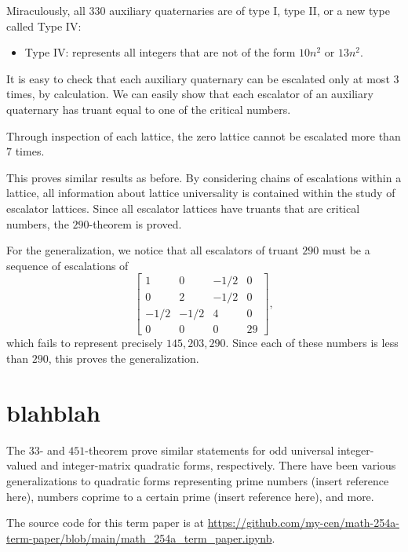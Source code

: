 \documentclass{article}
\begin{document}
Miraculously, all $330$ auxiliary quaternaries are of type I, type II, or a new type called Type IV:
\begin{itemize}
    \item Type IV: represents all integers that are not of the form $10n^2$ or $13n^2$.
\end{itemize}
It is easy to check that each auxiliary quaternary can be escalated only at most $3$ times, by calculation. We can easily show that each escalator of an auxiliary quaternary has truant equal to one of the critical numbers.

Through inspection of each lattice, the zero lattice cannot be escalated more than $7$ times.

This proves similar results as before. By considering chains of escalations within a lattice, all information about lattice universality is contained within the study of escalator lattices. Since all escalator lattices have truants that are critical numbers, the $290$-theorem is proved.

For the generalization, we notice that all escalators of truant $290$ must be a sequence of escalations of
\[\begin{bmatrix}
1 & 0 & -1/2 & 0 \\
0 & 2 & -1/2 & 0 \\
-1/2 & -1/2 & 4 & 0 \\
0 & 0 & 0 & 29
\end{bmatrix},\]
which fails to represent precisely $145, 203, 290$. Since each of these numbers is less than $290$, this proves the generalization.

\section{blahblah}

The $33$- and $451$-theorem prove similar statements for odd universal integer-valued and integer-matrix quadratic forms, respectively. There have been various generalizations to quadratic forms representing prime numbers (insert reference here), numbers coprime to a certain prime (insert reference here), and more.

The source code for this term paper is at \url{https://github.com/my-cen/math-254a-term-paper/blob/main/math_254a_term_paper.ipynb}.

\printbibliography
\end{document}
